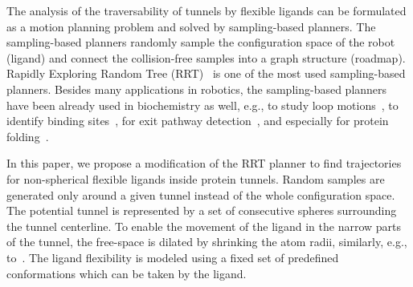 \documentclass[usletter, 10pt, conference]{ieeeconf} %
\begin{document}
The analysis of the traversability of tunnels by flexible ligands can be formulated as a motion planning problem and solved by sampling-based planners.
The sampling-based planners randomly sample the configuration space of the robot (ligand) and connect the collision-free samples into a graph structure (roadmap).
Rapidly Exploring Random Tree (RRT)~\cite{lavalleRRT} is one of the most used sampling-based planners.
Besides many applications in robotics, the sampling-based planners have been already used in biochemistry as well, 
e.g., to study loop motions~\cite{cortes2004geometric}, to identify binding sites~\cite{bayazit2001ligand}, for exit
pathway detection~\cite{cortes2010simulating,cortes2005path}, and especially for protein folding~\cite{raveh2009rapid,amato2002using}. %


In this paper, we propose a modification of the RRT planner to find trajectories for non-spherical flexible ligands inside protein tunnels.
Random samples are generated only around a given tunnel instead of the whole configuration space.
The potential tunnel is represented by a set of consecutive spheres surrounding the tunnel centerline.
To enable the movement of the ligand in the narrow parts of the tunnel, the free-space is dilated by shrinking the atom radii, similarly, e.g., to~\cite{hsu06multilevel}.  %
The ligand flexibility is modeled using a fixed set of predefined conformations which can be taken by the ligand.
\end{document}
